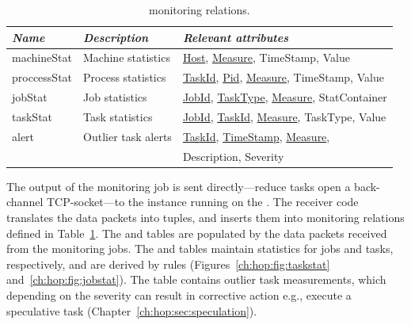 \begin{table}
\ssp
\centering
\begin{tabular}{|l|l|l|} \hline
\textit{Name}    & \textit{Description} & \textit{Relevant attributes} \\ \hline\hline
machineStat    & Machine statistics   & \underline{Host}, \underline{Measure}, TimeStamp, Value \\ \hline
proccessStat   & Process statistics    & \underline{TaskId}, \underline{Pid}, \underline{Measure}, TimeStamp, Value \\ \hline
jobStat              & Job statistics            & \underline{JobId}, \underline{TaskType}, \underline{Measure}, StatContainer \\ \hline
taskStat            & Task statistics          & \underline{JobId}, \underline{TaskId}, \underline{Measure}, TaskType, Value \\ \hline
alert                   & Outlier task alerts   & \underline{TaskId}, \underline{TimeStamp}, \underline{Measure}, \\
                           &                                   & Description, Severity \\ \hline
\end{tabular}
\caption{\JOL monitoring relations.}
\label{ch:hop:tbl:monitorCatalog}
\end{table}

The output of the monitoring job is sent directly---reduce tasks open a
back-channel TCP-socket---to the \JOL instance running on the \JT.  The
receiver code translates the data packets into \JOL tuples, and inserts them
into monitoring relations defined in Table~\ref{ch:hop:tbl:monitorCatalog}.
The  and  tables are populated by the data
packets received from the monitoring jobs.  The  and 
tables maintain statistics for jobs and tasks, respectively, and are derived by
\OVERLOG rules (Figures~\ref{ch:hop:fig:taskstat}
and~\ref{ch:hop:fig:jobstat}).  The  table contains outlier task
measurements, which depending on the severity can result in corrective action
e.g., execute a speculative task (Chapter~\ref{ch:hop:sec:speculation}).

